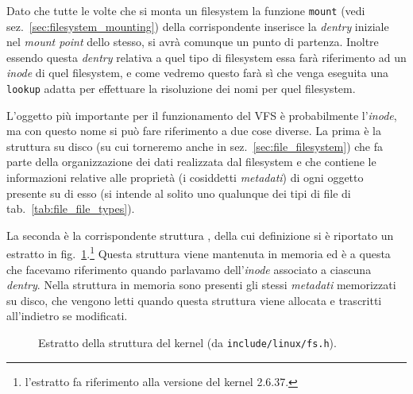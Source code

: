 Dato che tutte le volte che si monta un filesystem la funzione \texttt{mount}
(vedi sez.~\ref{sec:filesystem_mounting}) della corrispondente
 inserisce la \textit{dentry} iniziale nel
\textit{mount point} dello stesso, si avrà comunque un punto di
partenza. Inoltre essendo questa \textit{dentry} relativa a quel tipo di
filesystem essa farà riferimento ad un \textit{inode} di quel filesystem, e
come vedremo questo farà sì che venga eseguita una \texttt{lookup} adatta per
effettuare la risoluzione dei nomi per quel filesystem.



L'oggetto più importante per il funzionamento del VFS è probabilmente
l'\textit{inode}, ma con questo nome si può fare riferimento a due cose
diverse.  La prima è la struttura su disco (su cui torneremo anche in
sez.~\ref{sec:file_filesystem}) che fa parte della organizzazione dei dati
realizzata dal filesystem e che contiene le informazioni relative alle
proprietà (i cosiddetti \textsl{metadati}) di ogni oggetto presente su di esso
(si intende al solito uno qualunque dei tipi di file di
tab.~\ref{tab:file_file_types}).

La seconda è la corrispondente struttura , della cui
definizione si è riportato un estratto in
fig.~\ref{fig:kstruct_inode}.\footnote{l'estratto fa riferimento alla versione
  del kernel 2.6.37.} Questa struttura viene mantenuta in memoria ed è a
questa che facevamo riferimento quando parlavamo dell'\textit{inode} associato
a ciascuna \textit{dentry}. Nella struttura in memoria sono presenti gli
stessi \textsl{metadati} memorizzati su disco, che vengono letti quando questa
struttura viene allocata e trascritti all'indietro se modificati.

\begin{figure}[!htb]
  \footnotesize \centering
  \begin{minipage}[c]{0.8\textwidth}
  \end{minipage}
  \normalsize 
  \caption{Estratto della struttura  del kernel (da
    \texttt{include/linux/fs.h}).}
  \label{fig:kstruct_inode}
\end{figure}

